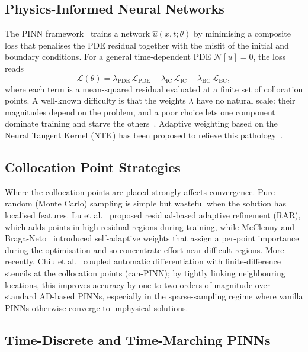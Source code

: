 \subsection{Physics-Informed Neural Networks}

The PINN framework~\cite{Raissi2019} trains a network
$\hat{u}(x,t;\theta)$ by minimising a composite loss that penalises the PDE
residual together with the misfit of the initial and boundary conditions. For
a general time-dependent PDE $\mathcal{N}[u] = 0$, the loss reads
\[
  \mathcal{L}(\theta)
  = \lambda_\text{PDE}\,\mathcal{L}_\text{PDE}
  + \lambda_\text{IC}\,\mathcal{L}_\text{IC}
  + \lambda_\text{BC}\,\mathcal{L}_\text{BC},
\]
where each term is a mean-squared residual evaluated at a finite set of
collocation points. A well-known difficulty is that the weights $\lambda$ have
no natural scale: their magnitudes depend on the problem, and a poor choice
lets one component dominate training and starve the
others~\cite{Wang2021}. Adaptive weighting based on the Neural Tangent Kernel
(NTK) has been proposed to relieve this pathology~\cite{Wang2021}.

\subsection{Collocation Point Strategies}

Where the collocation points are placed strongly affects convergence. Pure
random (Monte Carlo) sampling is simple but wasteful when the solution has
localised features. Lu et al.~\cite{Lu2019} proposed residual-based adaptive
refinement (RAR), which adds points in high-residual regions during training,
while McClenny and Braga-Neto~\cite{McClenny2021} introduced self-adaptive
weights that assign a per-point importance during the optimisation and so
concentrate effort near difficult regions. More recently, Chiu et
al.~\cite{Chiu2022} coupled automatic differentiation with finite-difference
stencils at the collocation points (can-PINN); by tightly linking neighbouring
locations, this improves accuracy by one to two orders of magnitude over
standard AD-based PINNs, especially in the sparse-sampling regime where vanilla
PINNs otherwise converge to unphysical solutions.

\subsection{Time-Discrete and Time-Marching PINNs}

